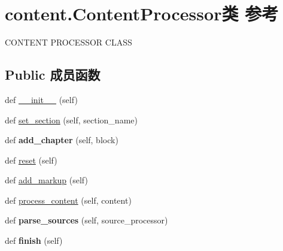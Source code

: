 \hypertarget{classcontent_1_1_content_processor}{}\section{content.\+Content\+Processor类 参考}
\label{classcontent_1_1_content_processor}


C\+O\+N\+T\+E\+NT P\+R\+O\+C\+E\+S\+S\+OR C\+L\+A\+SS  


\subsection*{Public 成员函数}
\begin{DoxyCompactItemize}
\item 
def \hyperlink{classcontent_1_1_content_processor_ab89414a8a63232189c5433fcd450a030}{\+\_\+\+\_\+init\+\_\+\+\_\+} (self)
\item 
def \hyperlink{classcontent_1_1_content_processor_a14e1401ef31e9e27d18a5d526697305f}{set\+\_\+section} (self, section\+\_\+name)
\item 
\mbox{\label{classcontent_1_1_content_processor_a54deb52db427259b6920886464b00e9e}} 
def {\bfseries add\+\_\+chapter} (self, block)
\item 
def \hyperlink{classcontent_1_1_content_processor_a50270833594711e862d06e5fea9131fa}{reset} (self)
\item 
def \hyperlink{classcontent_1_1_content_processor_a80c9aef136880bba3d0575785bcc1794}{add\+\_\+markup} (self)
\item 
def \hyperlink{classcontent_1_1_content_processor_ad0b20f704dbd7460afd09fa05b898b1a}{process\+\_\+content} (self, content)
\item 
\mbox{\label{classcontent_1_1_content_processor_a06d2a324c061c6dd00ec01a384a68670}} 
def {\bfseries parse\+\_\+sources} (self, source\+\_\+processor)
\item 
\mbox{\label{classcontent_1_1_content_processor_a77176cbb2931648a2d1d1796a08937f0}} 
def {\bfseries finish} (self)
\end{DoxyCompactItemize}
